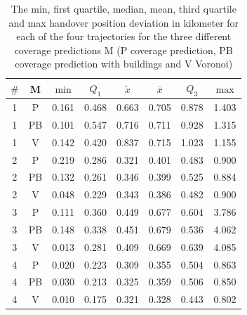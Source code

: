 \documentclass[twocolumn]{bmcart}%
\begin{document}
\begin{backmatter}
\begin{table}[h]
\caption{The min, first quartile, median, mean, third quartile and max handover position deviation in kilometer for each of the four trajectories for the three different coverage predictions M (P coverage prediction, PB coverage prediction with buildings and V Voronoi)}
\begin{tabular}{|c|c|c|c|c|c|c|c|}
\hline
\textbf{$\#$} & \textbf{M}& \textbf{$\min$}& \textbf{$Q_1$}     & \textbf{$\tilde{x}$} &\textbf{$\bar{x}$}   & \textbf{$Q_3$}    &\textbf{$\max$}   \\ \hline
1 & P & 0.161 & 0.468 & 0.663 & 0.705 & 0.878 & 1.403 \\ \hline
1 & PB  & 0.101 & 0.547 & 0.716 & 0.711 & 0.928 & 1.315 \\ \hline
1 & V & 0.142 & 0.420 & 0.837 & 0.715 & 1.023 & 1.155 \\ \hline
2 & P & 0.219 & 0.286 & 0.321 & 0.401 & 0.483 & 0.900 \\ \hline
2 & PB  & 0.132 & 0.261 & 0.346 & 0.399 & 0.525 & 0.884 \\ \hline
2 & V & 0.048 & 0.229 & 0.343 & 0.386 & 0.482 & 0.900 \\ \hline
3 & P & 0.111 & 0.360 & 0.449 & 0.677 & 0.604 & 3.786 \\ \hline
3 & PB  & 0.148 & 0.338 & 0.451 & 0.679 & 0.536 & 4.062 \\ \hline
3 & V & 0.013 & 0.281 & 0.409 & 0.669 & 0.639 & 4.085 \\ \hline
4 & P & 0.020 & 0.223 & 0.309 & 0.355 & 0.504 & 0.863 \\ \hline
4 & PB  & 0.030 & 0.213 & 0.325 & 0.359 & 0.506 & 0.850 \\ \hline
4 & V & 0.010 & 0.175 & 0.321 & 0.328 & 0.443 & 0.802 \\ \hline
\end{tabular}
\label{table:handover}
\end{table}



\end{backmatter}
\end{document}
